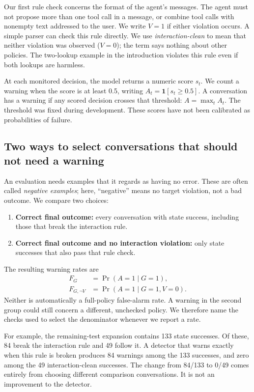 \documentclass[10pt]{article}
\newcommand{\ind}{\mathbf{1}}
\begin{document}
Our first rule check concerns the format of the agent's messages. The agent must not propose more than one tool call in a message, or combine tool calls with nonempty text addressed to the user. We write $V=1$ if either violation occurs. A simple parser can check this rule directly. We use \emph{interaction-clean} to mean that neither violation was observed ($V=0$); the term says nothing about other policies. The two-lookup example in the introduction violates this rule even if both lookups are harmless.

At each monitored decision, the model returns a numeric score $s_t$. We count a warning when the score is at least 0.5, writing $A_t=\ind[s_t\geq0.5]$. A conversation has a warning if any scored decision crosses that threshold: $A=\max_t A_t$. The threshold was fixed during development. These scores have not been calibrated as probabilities of failure.

\subsection{Two ways to select conversations that should not need a warning}
An evaluation needs examples that it regards as having no error. These are often called \emph{negative examples}; here, ``negative'' means no target violation, not a bad outcome. We compare two choices:
\begin{enumerate}
\item \textbf{Correct final outcome:} every conversation with state success, including those that break the interaction rule.
\item \textbf{Correct final outcome and no interaction violation:} only state successes that also pass that rule check.
\end{enumerate}
The resulting warning rates are
\begin{align}
 F_G &= \Pr(A=1\mid G=1),\\
 F_{G,\neg V} &= \Pr(A=1\mid G=1,V=0).
\end{align}
Neither is automatically a full-policy false-alarm rate. A warning in the second group could still concern a different, unchecked policy. We therefore name the checks used to select the denominator whenever we report a rate.

For example, the remaining-test expansion contains 133 state successes. Of these, 84 break the interaction rule and 49 follow it. A detector that warns exactly when this rule is broken produces 84 warnings among the 133 successes, and zero among the 49 interaction-clean successes. The change from 84/133 to 0/49 comes entirely from choosing different comparison conversations. It is not an improvement to the detector.
\end{document}
